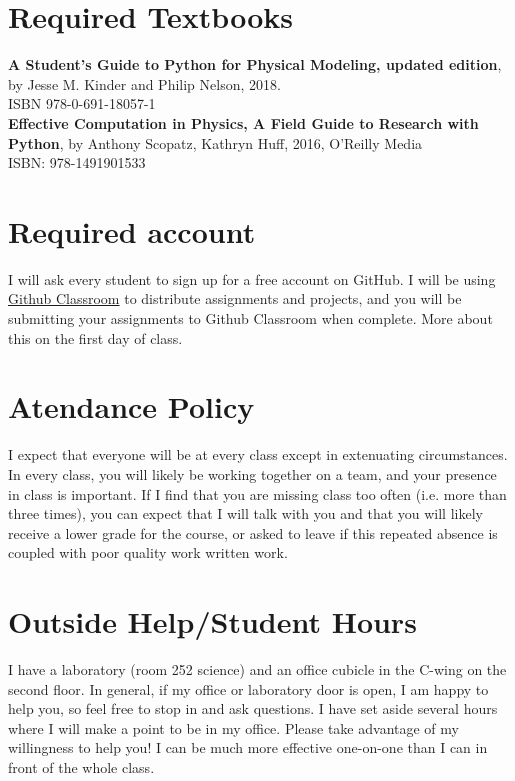 \documentclass[justified]{tufte-handout}
\begin{document}
\section{Required Textbooks}

\textbf{A Student's Guide to Python for Physical Modeling, updated edition}, by Jesse M. Kinder and Philip Nelson, 2018.\\
ISBN 978-0-691-18057-1\\

\noindent \textbf{Effective Computation in Physics, A Field Guide to Research with Python}, 
by Anthony Scopatz, Kathryn Huff, 2016, O'Reilly Media\\
ISBN: 978-1491901533\\

\section{Required account}
I will ask every student to sign up for a free account on GitHub. I will be using 
\href{http://classroom.github.com}{Github Classroom} to distribute assignments and projects, and you will be submitting your assignments to Github Classroom when complete. More about this on the first day of class. 

\section{Atendance Policy}
I expect that everyone will be at every class except in extenuating circumstances. 
In every class, you will likely be working together on a team, and your presence in class
is important.
If I find that you are missing class too often (i.e. more than three times), 
you can expect that I will talk with you and that you will likely receive a 
lower grade for the course, or asked to leave if this repeated absence is coupled 
with poor quality work written work. 

\section{Outside Help/Student Hours}
I have a laboratory (room 252 science) and an office cubicle in the C-wing on the second floor.
In general, if my office or laboratory door is open, I am happy to help you, so feel free to stop in
and ask questions. I have set aside several hours
where I will make a point to be in my office. Please take advantage of my
willingness to help you! I can be much more effective one-on-one than I can in
front of the whole class. 
\end{document}
